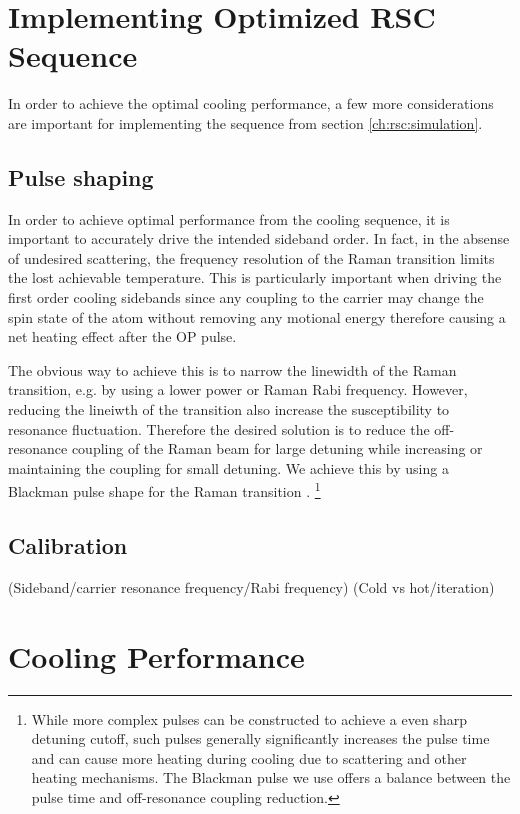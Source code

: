 \section{Implementing Optimized RSC Sequence}
\label{ch:rsc:implementation}

In order to achieve the optimal cooling performance, a few more considerations are important
for implementing the sequence from section \ref{ch:rsc:simulation}.

\subsection{Pulse shaping}
\label{ch:rsc:implementation:pulse-shaping}

In order to achieve optimal performance from the cooling sequence,
it is important to accurately drive the intended sideband order.
In fact, in the absense of undesired scattering,
the frequency resolution of the Raman transition limits the lost achievable temperature.
This is particularly important when driving the first order cooling sidebands
since any coupling to the carrier may change the spin state of the atom without
removing any motional energy therefore causing a net heating effect after the OP pulse.

The obvious way to achieve this is to narrow the linewidth of the Raman transition,
e.g. by using a lower power or Raman Rabi frequency.
However, reducing the lineiwth of the transition also increase the susceptibility
to resonance fluctuation.
Therefore the desired solution is to reduce the off-resonance coupling of the Raman beam
for large detuning while increasing or maintaining the coupling for small detuning.
We achieve this by using a Blackman pulse shape for the Raman transition \todo{\cite{}}.
\footnote{While more complex pulses can be constructed to achieve a even sharp detuning cutoff,
  \todo{\cite{}} such pulses generally significantly increases the pulse time
  and can cause more heating during cooling due to scattering and other heating mechanisms.
  The Blackman pulse we use offers a balance between the pulse time
  and off-resonance coupling reduction.}

\subsection{Calibration}

(Sideband/carrier resonance frequency/Rabi frequency)
(Cold vs hot/iteration)

\section{Cooling Performance}

